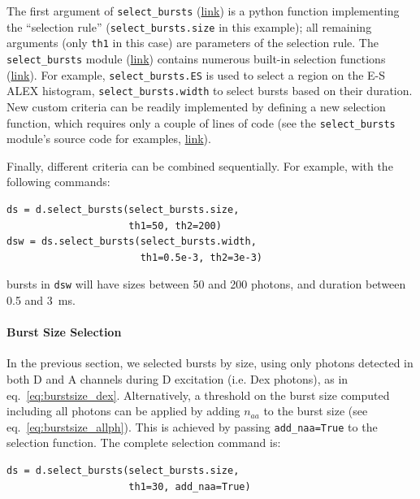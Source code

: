 \documentclass[10pt,letterpaper]{article}
\begin{document}
The first argument of \verb|select_bursts|
(\href{http://fretbursts.readthedocs.org/en/latest/data_class.html#burst-selection-methods}{link})
is a python function implementing the ``selection rule'' (\verb|select_bursts.size| in this example);
all remaining arguments (only \verb|th1| in this case) are parameters of the selection rule.
The \verb|select_bursts| module
(\href{http://fretbursts.readthedocs.org/en/latest/burst_selection.html}{link})
contains numerous built-in selection functions
(\href{http://fretbursts.readthedocs.org/en/latest/burst_selection.html#module-fretbursts.select_bursts}{link}).
For example,
\verb|select_bursts.ES|
is used to select a region on the E-S ALEX histogram,
\verb|select_bursts.width|
to select bursts based on their duration.
New custom criteria can be readily implemented by defining a new selection function,
which requires only a couple of lines of code (see the
\verb|select_bursts| module's source code for examples,
\href{https://github.com/tritemio/FRETBursts/blob/master/fretbursts/select_bursts.py}{link}).

Finally, different criteria can be combined sequentially.
For example, with the following commands:

\begin{lstlisting}
ds = d.select_bursts(select_bursts.size,
                     th1=50, th2=200)
dsw = ds.select_bursts(select_bursts.width,
                       th1=0.5e-3, th2=3e-3)
\end{lstlisting}

bursts in \verb|dsw|
will have sizes between 50 and 200 photons, and duration between 0.5 and 3~ms.

\paragraph*{Burst Size Selection}
In the previous section, we selected bursts by size, using only
photons detected in both D and A channels during D excitation (i.e. Dex photons),
as in eq.~\ref{eq:burstsize_dex}.
Alternatively, a threshold on the burst size computed including all photons
can be applied by adding $n_{aa}$ to the burst size (see eq.~\ref{eq:burstsize_allph}).
This is achieved
by passing \verb|add_naa=True| to the selection function.
The complete selection command is:

\begin{lstlisting}
ds = d.select_bursts(select_bursts.size,
                     th1=30, add_naa=True)
\end{lstlisting}
\end{document}
